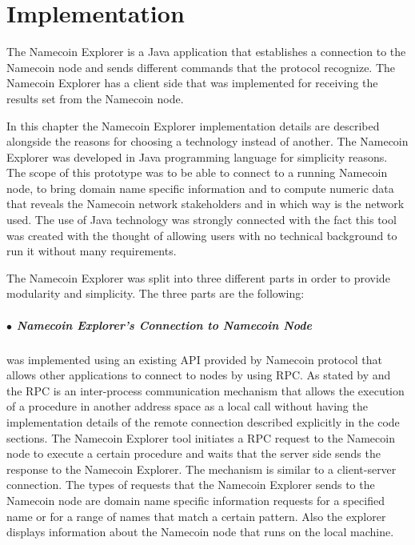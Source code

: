 \chapter{Implementation}
\label{chapter:5}

The Namecoin Explorer is a Java application that establishes a connection to the Namecoin node and sends different commands that the protocol recognize. The Namecoin Explorer has a client side that was implemented for receiving the results set from the Namecoin node.

In this chapter the Namecoin Explorer implementation details are described alongside the reasons for choosing a technology instead of another.
The Namecoin Explorer was developed in Java programming language for simplicity reasons. The scope of this prototype was to be able to connect to a running Namecoin node, to bring domain name specific information and to compute numeric data that reveals the Namecoin network stakeholders and in which way is the network used. The use of Java technology was strongly connected with the fact this tool was created with the thought of allowing users with no technical background to run it without many requirements.

The Namecoin Explorer was split into three different parts in order to provide modularity and simplicity. The three parts are the following:

\paragraph{$\bullet$ Namecoin Explorer's Connection to Namecoin Node} was implemented using an existing API provided by Namecoin protocol that allows other applications to connect to nodes by using RPC. As stated by \cite{rfc1057} and \cite{rfc5531} the RPC is an inter-process communication mechanism that allows the execution of a procedure in another address space as a local call without having the implementation details of the remote connection described explicitly in the code sections. The Namecoin Explorer tool initiates a RPC request to the Namecoin node to execute a certain procedure and waits that the server side sends the response to the Namecoin Explorer. The mechanism is similar to a client-server connection. The types of requests that the Namecoin Explorer sends to the Namecoin node are domain name specific information requests for a specified name or for a range of names that match a certain pattern. Also the explorer displays information about the Namecoin node that runs on the local machine.

